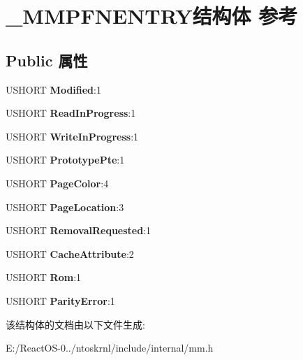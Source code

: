 \hypertarget{struct___m_m_p_f_n_e_n_t_r_y}{}\section{\+\_\+\+M\+M\+P\+F\+N\+E\+N\+T\+R\+Y结构体 参考}
\label{struct___m_m_p_f_n_e_n_t_r_y}
\subsection*{Public 属性}
\begin{DoxyCompactItemize}
\item 
\mbox{\label{struct___m_m_p_f_n_e_n_t_r_y_a3cf4a569dfc7deaa575546e06cf54394}} 
U\+S\+H\+O\+RT {\bfseries Modified}\+:1
\item 
\mbox{\label{struct___m_m_p_f_n_e_n_t_r_y_a5501e1d75ffb02477c469598cb4bf13d}} 
U\+S\+H\+O\+RT {\bfseries Read\+In\+Progress}\+:1
\item 
\mbox{\label{struct___m_m_p_f_n_e_n_t_r_y_af511f81a92e1c7dbc8dc94307ff9bb80}} 
U\+S\+H\+O\+RT {\bfseries Write\+In\+Progress}\+:1
\item 
\mbox{\label{struct___m_m_p_f_n_e_n_t_r_y_a29d866fa0818cc186b3ab028bf000112}} 
U\+S\+H\+O\+RT {\bfseries Prototype\+Pte}\+:1
\item 
\mbox{\label{struct___m_m_p_f_n_e_n_t_r_y_a1209c0306a654c2ac86c0a4f17de9655}} 
U\+S\+H\+O\+RT {\bfseries Page\+Color}\+:4
\item 
\mbox{\label{struct___m_m_p_f_n_e_n_t_r_y_a6240a05ea6f6c3bcc9dafc36be77d5cd}} 
U\+S\+H\+O\+RT {\bfseries Page\+Location}\+:3
\item 
\mbox{\label{struct___m_m_p_f_n_e_n_t_r_y_a0e63c7328b44b215808d96e63c6382b0}} 
U\+S\+H\+O\+RT {\bfseries Removal\+Requested}\+:1
\item 
\mbox{\label{struct___m_m_p_f_n_e_n_t_r_y_a0f221b620e1986aceef8514517ac95be}} 
U\+S\+H\+O\+RT {\bfseries Cache\+Attribute}\+:2
\item 
\mbox{\label{struct___m_m_p_f_n_e_n_t_r_y_a75bfdd953c9ddb637f00837b3c2e45f6}} 
U\+S\+H\+O\+RT {\bfseries Rom}\+:1
\item 
\mbox{\label{struct___m_m_p_f_n_e_n_t_r_y_aaa1e18a6e12d81759af14e058ab7a52d}} 
U\+S\+H\+O\+RT {\bfseries Parity\+Error}\+:1
\end{DoxyCompactItemize}


该结构体的文档由以下文件生成\+:\begin{DoxyCompactItemize}
\item 
E\+:/\+React\+O\+S-\/0../ntoskrnl/include/internal/mm.\+h\end{DoxyCompactItemize}
